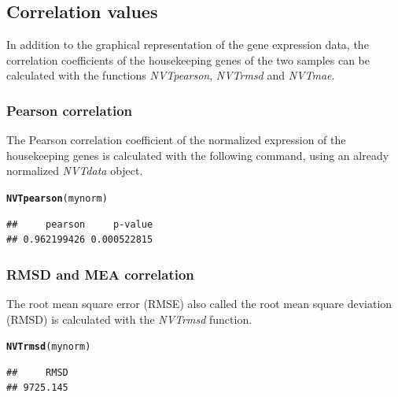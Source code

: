 \documentclass[11pt]{article}\usepackage[]{graphicx}\usepackage[usenames,dvipsnames]{color}
\makeatletter
\newcommand{\hlstd}[1]{\textcolor[rgb]{0.345,0.345,0.345}{#1}}%
\newcommand{\hlkwd}[1]{\textcolor[rgb]{0.737,0.353,0.396}{\textbf{#1}}}%
\newenvironment{kframe}{%
 \def\at@end@of@kframe{}%
 \ifinner\ifhmode%
  \def\at@end@of@kframe{\end{minipage}}%
  \begin{minipage}{\columnwidth}%
 \fi\fi%
 \def\FrameCommand##1{\hskip\@totalleftmargin \hskip-\fboxsep
 \colorbox{shadecolor}{##1}\hskip-\fboxsep
     \hskip-\linewidth \hskip-\@totalleftmargin \hskip\columnwidth}%
 \MakeFramed {\advance\hsize-\width
   \@totalleftmargin\z@ \linewidth\hsize
   \@setminipage}}%
 {\par\unskip\endMakeFramed%
 \at@end@of@kframe}
\newenvironment{knitrout}{}{} %
\makeatother
\begin{document}
\subsection{Correlation values}

In addition to the graphical representation of the gene expression data, the correlation coefficients of the housekeeping genes of the two samples can be calculated with the functions \textit{NVTpearson}, \textit{NVTrmsd} and \textit{NVTmae}.

\subsubsection{Pearson correlation}

The Pearson correlation coefficient of the normalized expression of the housekeeping genes is calculated with the following command, using an already normalized \textit{NVTdata} object.

\begin{knitrout}
\color{fgcolor}\begin{kframe}
\begin{alltt}
\hlkwd{NVTpearson}\hlstd{(mynorm)}
\end{alltt}
\begin{verbatim}
##     pearson     p-value 
## 0.962199426 0.000522815
\end{verbatim}
\end{kframe}
\end{knitrout}

\subsubsection{RMSD and MEA correlation}

The root mean square error (RMSE) also called the root mean square deviation (RMSD) is calculated with the \textit{NVTrmsd} function.

\begin{knitrout}
\color{fgcolor}\begin{kframe}
\begin{alltt}
\hlkwd{NVTrmsd}\hlstd{(mynorm)}
\end{alltt}
\begin{verbatim}
##     RMSD 
## 9725.145
\end{verbatim}
\end{kframe}
\end{knitrout}
\end{document}
